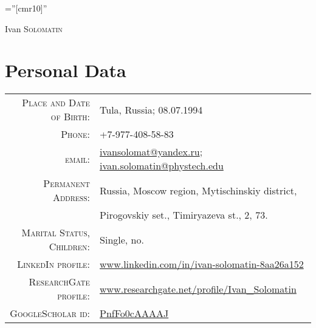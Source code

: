 \documentclass[a4paper,10pt]{article}
\begin{document}

\pagestyle{empty} %

\font\fb=''[cmr10]'' %

\par{\centering
		{\Huge Ivan \textsc{Solomatin}
	}\bigskip\par}

\section{Personal Data}

\begin{tabular}{rl}
    \textsc{Place and Date of Birth:} & Tula, Russia; 08.07.1994 \\
    \textsc{Phone:}     & +7-977-408-58-83\\
    \textsc{email:}     & \href{mailto:ivansolomat@yandex.ru}{ivansolomat@yandex.ru}; \href{mailto:ivan.solomatin@phystech.edu}{ivan.solomatin@phystech.edu}\\
    \textsc{Permanent Address:} & Russia, Moscow region, Mytischinskiy district, \\ 
                                & Pirogovskiy set., Timiryazeva st., 2, 73.	\\
    \textsc{Marital Status, Children:} & Single, no.\\
    \textsc{LinkedIn profile:} & \href{https://www.linkedin.com/in/ivan-solomatin-8aa26a152}{www.linkedin.com/in/ivan-solomatin-8aa26a152}\\
    \textsc{ResearchGate profile:} & \href{https://www.researchgate.net/profile/Ivan_Solomatin}{www.researchgate.net/profile/Ivan\_Solomatin}\\
    \textsc{GoogleScholar id:} & \href{https://scholar.google.ru/citations?user=PnfFo0cAAAAJ}{PnfFo0cAAAAJ}

\end{tabular}
\end{document}
